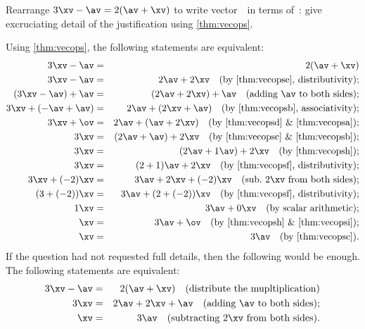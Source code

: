 \begin{OmitV1}
\begin{example} 
Rearrange \(3\xv-\av=2(\av+\xv)\) to write vector~\xv\ in terms of~\av: give excruciating detail of the justification using \cref{thm:vecops}.
\begin{solution} 
Using \cref{thm:vecops}, the following statements are equivalent:
\begin{eqnarray*}
3\xv-\av&=&2(\av+\xv)
\\3\xv-\av&=&2\av+2\xv
\quad\text{(by \ref{thm:vecopse}, distributivity);}
\\(3\xv-\av)+\av&=&(2\av+2\xv)+\av
\quad(\text{adding \av\ to both sides});
\\3\xv+(-\av+\av)&=&2\av+(2\xv+\av)
\quad\text{(by \ref{thm:vecopsb}, associativity);}
\\3\xv+\ov&=&2\av+(\av+2\xv)
\quad\text{(by \ref{thm:vecopsd} \& \ref{thm:vecopsa});}
\\3\xv&=&(2\av+\av)+2\xv
\quad\text{(by \ref{thm:vecopsc} \& \ref{thm:vecopsb});}
\\3\xv&=&(2\av+1\av)+2\xv
\quad(\text{by \ref{thm:vecopsh}});
\\3\xv&=&(2+1)\av+2\xv
\quad\text{(by \ref{thm:vecopsf}, distributivity);}
\\3\xv+(-2)\xv&=&3\av+2\xv+(-2)\xv
\quad(\text{sub.\ \(2\xv\) from both sides});
\\(3+(-2))\xv&=&3\av+(2+(-2))\xv
\quad\text{(by \ref{thm:vecopsf}, distributivity);}
\\1\xv&=&3\av+0\xv
\quad(\text{by scalar arithmetic});
\\\xv&=&3\av+\ov
\quad\text{(by \ref{thm:vecopsh} \& \ref{thm:vecopsi});}
\\\xv&=&3\av
\quad(\text{by \ref{thm:vecopsc}}).
\end{eqnarray*}
If the question had not requested full details, then the following would be enough.
The following statements are equivalent:
\begin{eqnarray*}
3\xv-\av&=&2(\av+\xv)
\quad(\text{distribute the mupltiplication})
\\3\xv&=&2\av+2\xv+\av
\quad(\text{adding \av\ to both sides});
\\\xv&=&3\av
\quad(\text{subtracting \(2\xv\) from both sides}).
\end{eqnarray*}
\end{solution}
\end{example}
\end{OmitV1}








